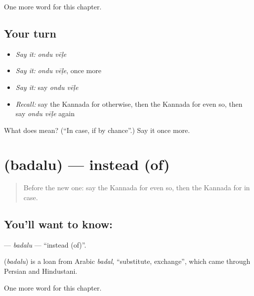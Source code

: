\begin{grammarlens}[title={What you've built}]
One more word for this chapter.
\end{grammarlens}

\subsection*{Your turn}
\begin{itemize}
\raggedright
  \item \emph{Say it:} \emph{ondu vēḷe}
  \item \emph{Say it:} \emph{ondu vēḷe}, once more
  \item \emph{Say it:} say \emph{ondu vēḷe}
  \item \emph{Recall:} say the Kannada for otherwise, then the Kannada for even so, then say \emph{ondu vēḷe} again
\end{itemize}

\begin{tcolorbox}[breakable,colback=teal!4,colframe=teal!35!black,title={Before you move on}]
What does   mean? (\textquotedblleft{}In case, if by chance\textquotedblright{}.) Say it once more.
\end{tcolorbox}
\section[\texorpdfstring{\kn{ಬದಲು} (badalu)}{ಬದಲು (badalu)}]{ (badalu) — instead (of)}

\label{lesson:KA-C176-badalu}



\begin{quote}
Before the new one: say the Kannada for even so, then the Kannada for in case.
\end{quote}

\subsection*{You'll want to know: }
\textbf{} — \emph{badalu} — \textquotedblleft{}instead (of)\textquotedblright{}.

\begin{cousinweb}
\textbf{} (\emph{badalu}) is a loan from Arabic \emph{badal}, \textquotedblleft{}substitute, exchange\textquotedblright{}, which came through Persian and Hindustani.
\end{cousinweb}

\begin{grammarlens}[title={What you've built}]
One more word for this chapter.
\end{grammarlens}

